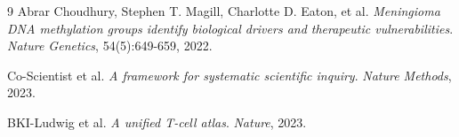 \documentclass[11pt]{article}
\begin{document}
\begin{thebibliography}{9}
Abrar Choudhury, Stephen T. Magill, Charlotte D. Eaton, et al.
\textit{Meningioma DNA methylation groups identify biological drivers and therapeutic vulnerabilities}.
\textit{Nature Genetics}, 54(5):649-659, 2022.

Co-Scientist et al.
\textit{A framework for systematic scientific inquiry}.
\textit{Nature Methods}, 2023.

BKI-Ludwig et al.
\textit{A unified T-cell atlas}.
\textit{Nature}, 2023.
\end{thebibliography}
\end{document}
